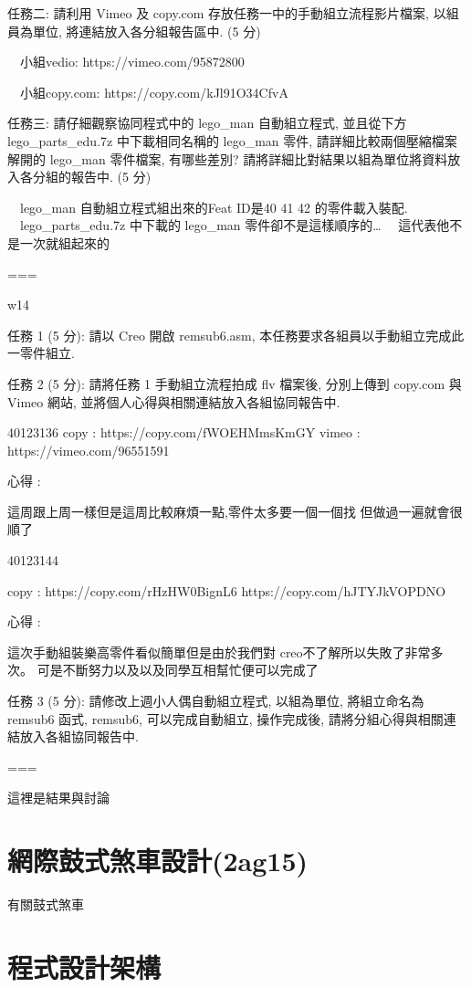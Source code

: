 \documentclass[]{article}
\begin{document}
任務二: 請利用 Vimeo 及 copy.com 存放任務一中的手動組立流程影片檔案,
以組員為單位, 將連結放入各分組報告區中. (5 分)

　小組vedio: https://vimeo.com/95872800

　小組copy.com: https://copy.com/kJl91O34CfvA

任務三: 請仔細觀察協同程式中的 lego\_man 自動組立程式, 並且從下方
lego\_parts\_edu.7z 中下載相同名稱的 lego\_man 零件,
請詳細比較兩個壓縮檔案解開的 lego\_man 零件檔案, 有哪些差別?
請將詳細比對結果以組為單位將資料放入各分組的報告中. (5 分)

　lego\_man 自動組立程式組出來的Feat ID是40 41 42 的零件載入裝配.
　lego\_parts\_edu.7z 中下載的 lego\_man 零件卻不是這樣順序的\ldots{}
　這代表他不是一次就組起來的

===

w14

任務 1 (5 分): 請以 Creo 開啟 remsub6.asm,
本任務要求各組員以手動組立完成此一零件組立.

任務 2 (5 分): 請將任務 1 手動組立流程拍成 flv 檔案後, 分別上傳到
copy.com 與 Vimeo 網站, 並將個人心得與相關連結放入各組協同報告中.

40123136 copy : https://copy.com/fWOEHMmsKmGY vimeo :
https://vimeo.com/96551591

心得 :

這周跟上周一樣但是這周比較麻煩一點,零件太多要一個一個找
但做過一遍就會很順了

40123144

copy : https://copy.com/rHzHW0BignL6 https://copy.com/hJTYJkVOPDNO

心得 :

這次手動組裝樂高零件看似簡單但是由於我們對
creo不了解所以失敗了非常多次。
可是不斷努力以及以及同學互相幫忙便可以完成了

任務 3 (5 分): 請修改上週小人偶自動組立程式, 以組為單位, 將組立命名為
remsub6 函式, remsub6, 可以完成自動組立, 操作完成後,
請將分組心得與相關連結放入各組協同報告中.

===

這裡是結果與討論

\section{網際鼓式煞車設計(2ag15)}\label{ux7db2ux969bux9f13ux5f0fux715eux8ecaux8a2dux8a082ag15}

有關鼓式煞車

\section{程式設計架構}\label{ux7a0bux5f0fux8a2dux8a08ux67b6ux69cb-3}
\end{document}
